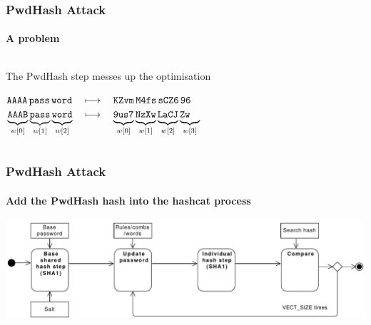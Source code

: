 \documentclass[handout, notes=hide]{beamer}
\begin{document}

\begin{frame}
\frametitle{PwdHash Attack}
\framesubtitle{A problem}
\setlength{\parskip}{0.5em}

\begin{columns}[T]
\begin{column}[T]{1.0\textwidth}
\setlength{\parskip}{0.5em}

The PwdHash step messes up the optimisation

${\tt AAAA}\, {\tt pass}\, {\tt word} \quad \longmapsto \quad {\tt KZvm}\, {\tt M4fs}\, {\tt sCZ6}\, {\tt 96\quad}$ \\
$\underbrace{{\tt\vphantom{p}AAAB}}_{w[0]}\underbrace{{\tt\vphantom{p}pass}}_{w[1]}\underbrace{{\tt\vphantom{p}word}}_{w[2]} \quad \longmapsto \quad \underbrace{{\tt\vphantom{p}9us7}}_{w[0]}\underbrace{{\tt\vphantom{p}NzXw}}_{w[1]}\underbrace{{\tt\vphantom{p}LaCJ}}_{w[2]}\underbrace{{\tt\vphantom{p}Zw\quad }}_{w[3]}$

\end{column}
\end{columns}


\end{frame}


\begin{frame}
\frametitle{PwdHash Attack}
\framesubtitle{Add the PwdHash hash into the hashcat process}
\setlength{\parskip}{0.5em}

\includegraphics[width=1.0\textwidth]{process-orig}

\end{frame}

\end{document}
